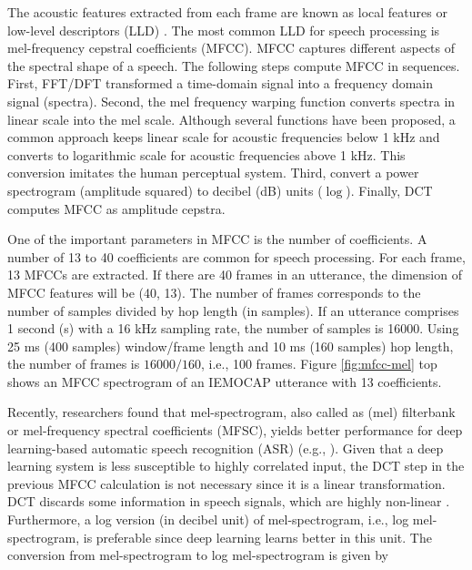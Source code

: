 The acoustic features extracted from each frame are known as local features or
low-level descriptors (LLD) \cite{Herrera1999}. The most common LLD for speech
processing is mel-frequency cepstral coefficients (MFCC). MFCC captures
different aspects of the spectral shape of a speech. The following steps
compute MFCC in sequences. First, FFT/DFT transformed a time-domain signal into
a frequency domain signal (spectra). Second, the mel frequency warping function
converts spectra in linear scale into the mel scale. Although several functions
have been proposed, a common approach keeps linear scale for acoustic
frequencies below 1 kHz and converts to logarithmic scale for acoustic
frequencies above 1 kHz. This conversion imitates the human perceptual system.
Third, convert a power spectrogram (amplitude squared) to decibel (dB) units
($\log$). Finally, DCT computes MFCC as amplitude cepstra.

One of the important parameters in MFCC is the number of coefficients. A number
of 13 to 40 coefficients are common for speech processing. For each frame, 13
MFCCs are extracted. If there are 40 frames in an utterance, the dimension of
MFCC features will be (40, 13). The number of frames corresponds to the number
of samples divided by hop length (in samples).  If an utterance comprises 1
second (s) with a 16 kHz sampling rate, the number of samples is 16000. Using
25 ms (400 samples) window/frame length and 10 ms (160 samples) hop length, the
number of frames is $16000/160$, i.e., 100 frames. Figure \ref{fig:mfcc-mel}
top shows an MFCC spectrogram of an IEMOCAP utterance with 13 coefficients.

Recently, researchers found that mel-spectrogram, also called as (mel)
filterbank or mel-frequency spectral coefficients (MFSC), yields better
performance for deep learning-based automatic speech recognition (ASR) (e.g.,
\cite{Mohamed2014}). Given that a deep learning system is less susceptible to
highly correlated input, the DCT step in the previous MFCC calculation is not
necessary since it is a linear transformation.  DCT discards some information
in speech signals, which are highly non-linear \cite{fayek2016}. Furthermore, a
log version (in decibel unit) of mel-spectrogram, i.e., log mel-spectrogram, is
preferable since deep learning learns better in this unit. The conversion from
mel-spectrogram to log mel-spectrogram is given by


